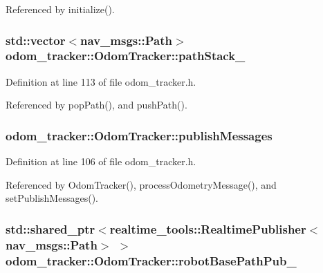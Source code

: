 Referenced by initialize().

\subsubsection[{\texorpdfstring{path\+Stack\+\_\+}{pathStack_}}]{\setlength{\rightskip}{0pt plus 5cm}std\+::vector$<$nav\+\_\+msgs\+::\+Path$>$ odom\+\_\+tracker\+::\+Odom\+Tracker\+::path\+Stack\+\_\+\hspace{0.3cm}{\ttfamily [protected]}}\hypertarget{classodom__tracker_1_1OdomTracker_a86188f3fcc8f7ce17e860cefb62d13fb}{}\label{classodom__tracker_1_1OdomTracker_a86188f3fcc8f7ce17e860cefb62d13fb}


Definition at line 113 of file odom\+\_\+tracker.\+h.



Referenced by pop\+Path(), and push\+Path().

\subsubsection[{\texorpdfstring{publish\+Messages}{publishMessages}}]{ odom\+\_\+tracker\+::\+Odom\+Tracker\+::publish\+Messages\hspace{0.3cm}{\ttfamily [protected]}}\hypertarget{classodom__tracker_1_1OdomTracker_a4d617a7bc17a7880a5ebee9697f827c0}{}\label{classodom__tracker_1_1OdomTracker_a4d617a7bc17a7880a5ebee9697f827c0}


Definition at line 106 of file odom\+\_\+tracker.\+h.



Referenced by Odom\+Tracker(), process\+Odometry\+Message(), and set\+Publish\+Messages().

\subsubsection[{\texorpdfstring{robot\+Base\+Path\+Pub\+\_\+}{robotBasePathPub_}}]{\setlength{\rightskip}{0pt plus 5cm}std\+::shared\+\_\+ptr$<$realtime\+\_\+tools\+::\+Realtime\+Publisher$<$nav\+\_\+msgs\+::\+Path$>$ $>$ odom\+\_\+tracker\+::\+Odom\+Tracker\+::robot\+Base\+Path\+Pub\+\_\+\hspace{0.3cm}{\ttfamily [protected]}}\hypertarget{classodom__tracker_1_1OdomTracker_a53e20a1b81ef82bf4c736d554e77a828}{}\label{classodom__tracker_1_1OdomTracker_a53e20a1b81ef82bf4c736d554e77a828}


